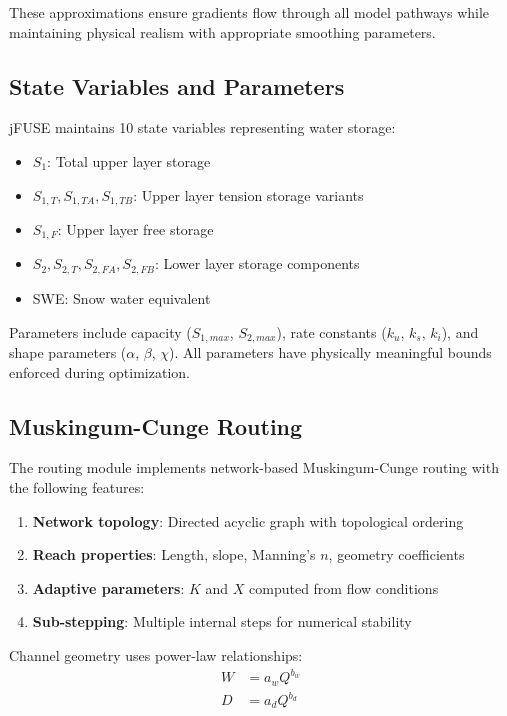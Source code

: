 \documentclass[11pt,a4paper]{article}
\begin{document}
These approximations ensure gradients flow through all model pathways while maintaining physical realism with appropriate smoothing parameters.

\subsection{State Variables and Parameters}

jFUSE maintains 10 state variables representing water storage:
\begin{itemize}
    \item $S_1$: Total upper layer storage
    \item $S_{1,T}, S_{1,TA}, S_{1,TB}$: Upper layer tension storage variants
    \item $S_{1,F}$: Upper layer free storage
    \item $S_2, S_{2,T}, S_{2,FA}, S_{2,FB}$: Lower layer storage components
    \item SWE: Snow water equivalent
\end{itemize}

Parameters include capacity ($S_{1,max}$, $S_{2,max}$), rate constants ($k_u$, $k_s$, $k_i$), and shape parameters ($\alpha$, $\beta$, $\chi$). All parameters have physically meaningful bounds enforced during optimization.

\subsection{Muskingum-Cunge Routing}

The routing module implements network-based Muskingum-Cunge routing with the following features:

\begin{enumerate}
    \item \textbf{Network topology}: Directed acyclic graph with topological ordering
    \item \textbf{Reach properties}: Length, slope, Manning's $n$, geometry coefficients
    \item \textbf{Adaptive parameters}: $K$ and $X$ computed from flow conditions
    \item \textbf{Sub-stepping}: Multiple internal steps for numerical stability
\end{enumerate}

Channel geometry uses power-law relationships:
\begin{align}
    W &= a_w Q^{b_w} \\
    D &= a_d Q^{b_d}
\end{align}
\end{document}
